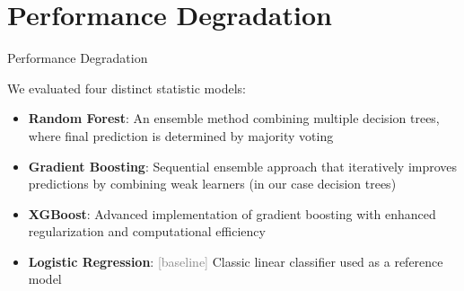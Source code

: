 \section{Performance Degradation} \label{sec:performance-degradation}

\begin{frame}{Performance Degradation}
    
    We evaluated four distinct statistic models:
    
    \small
    \begin{itemize}
        \item \textbf{Random Forest}: An ensemble method combining multiple decision trees, where final prediction is determined by majority voting
        \item \textbf{Gradient Boosting}: Sequential ensemble approach that iteratively improves predictions by combining weak learners (in our case decision trees)
        \item \textbf{XGBoost}: Advanced implementation of gradient boosting with enhanced regularization and computational efficiency
        \item \textbf{Logistic Regression}: \textcolor{gray}{[baseline]} Classic linear classifier used as a reference model
    \end{itemize}
    
\end{frame}

